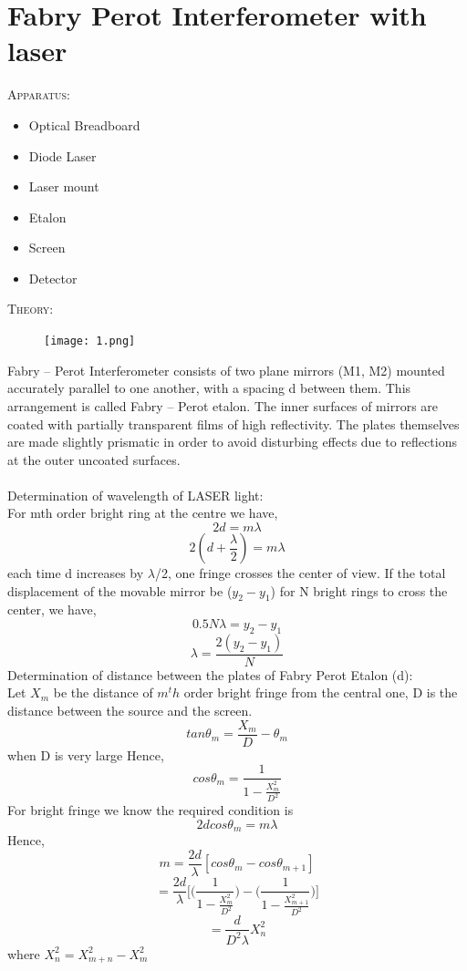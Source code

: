 \documentclass[12pt]{report}
\begin{document}
	\section{Fabry Perot Interferometer with laser }
	\textsc{\large{Apparatus:}}
	\begin{itemize}
		\item Optical Breadboard
		\item Diode Laser
		\item Laser mount
		\item Etalon
		\item Screen
		\item Detector
	\end{itemize}
	\textsc{\large{Theory: }}
	\begin{figure}[h]
		\centering
		\texttt{[image: 1.png]}
	\end{figure}
	Fabry – Perot Interferometer consists of two plane mirrors (M1, M2) mounted accurately parallel to one another, with a spacing d between them. This arrangement is called Fabry – Perot etalon. The inner surfaces of mirrors are coated with partially transparent films of high reflectivity. The plates themselves are made slightly prismatic in order to avoid disturbing effects due to reflections at the outer uncoated surfaces.\\\\
	Determination of wavelength of LASER light:\\
	For mth order bright ring at the centre we have,
	$$2d = m\lambda$$
	$$2(d + \frac{\lambda}{2}) = m\lambda$$
	each time d increases by $\lambda$/2, one fringe crosses the center of view. If the total displacement of the movable mirror be ($y_2-y_1$) for N bright rings to cross the center, we have,
	$$0.5N\lambda = y_2 - y_1$$
	$$\lambda = \frac{2(y_2-y_1)}{N} $$
	Determination of distance between the plates of Fabry Perot Etalon (d):\\
	Let $X_m$ be the distance of $m^th$ order bright fringe from the central one, D is the distance between the source and the screen.
	$$tan\theta_m = \frac{X_m}{D}-\theta_m$$ when D is very large
	Hence,
	$$cos\theta_m = \frac{1}{1-\frac{X^2_m}{D^2}}$$
	For bright fringe we know the required condition is 
	$$ 2dcos\theta_m = m\lambda$$
	Hence,
	$$m = \frac{2d}{\lambda}[cos\theta_m - cos\theta_{m+1}]$$
	$$ = \frac{2d}{\lambda}\Big[\Big(\frac{1}{1-\frac{X^2_m}{D^2}}\Big)-\Big(\frac{1}{1-\frac{X^2_{m+1}}{D^2}}\Big)\Big]$$
	$$ = \frac{d}{D^2\lambda} X^2_n$$
	where $X^2_n = X^2_{m+n} - X^2_m$\\
\end{document}
